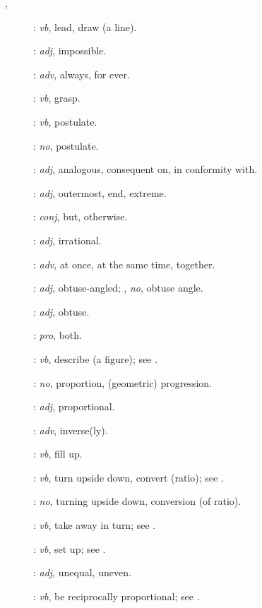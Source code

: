 {\begin{description}
\item [,]  :  {\em vb}, lead, draw (a line).
\item[]: {\em adj}, impossible.
\item[]: {\em adv}, always, for ever.
\item[]:
{\em vb}, grasp.
\item[]: {\em vb}, postulate.
\item[]: {\em no}, postulate.
\item[]: {\em adj}, analogous, consequent on, in conformity with.
\item[]: {\em adj}, outermost, end, extreme.
\item[]: {\em conj}, but, otherwise.
\item[]: {\em adj}, irrational.
\item[]: {\em adv}, at once, at the same time, together.
\item[]: {\em adj}, obtuse-angled; , {\em no}, obtuse angle.
\item[]: {\em adj}, obtuse.
\item[]: {\em pro}, both.
\item[]: {\em vb}, describe (a figure); see .
\item[]: {\em no}, proportion, (geometric) progression.
\item[]: {\em adj}, proportional.
\item[]: {\em adv}, inverse(ly).
\item[]: {\em vb}, fill up.
\item[]: {\em vb}, turn upside down, convert (ratio); see .
\item[]: {\em no}, turning upside down, conversion (of ratio).
\item[]: {\em vb}, take away in turn; see .
\item[]: {\em vb}, set up; see .
\item[]: {\em adj}, unequal, uneven.
\item[]: {\em vb}, be reciprocally proportional; see .

\end{description}}
